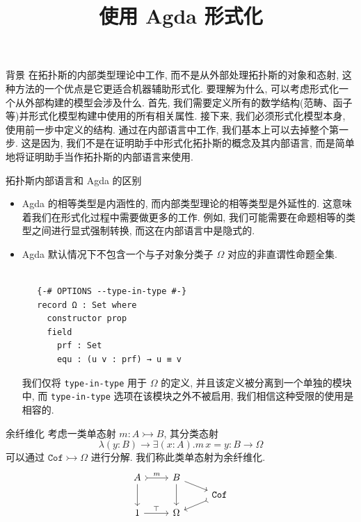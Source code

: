 \documentclass[aspectratio=169,xcolor=dvipsnames]{beamer}
\title{使用 Agda 形式化}
\date{}
\newcommand\Cof{\mathtt{Cof}}
\begin{document}
\begin{frame}
    \titlepage
\end{frame}

\begin{frame}{背景}
  在拓扑斯的内部类型理论中工作, 而不是从外部处理拓扑斯的对象和态射, 这种方法的一个优点是它更适合机器辅助形式化. 要理解为什么, 可以考虑形式化一个从外部构建的模型会涉及什么. 首先, 我们需要定义所有的数学结构(范畴、函子等)并形式化模型构建中使用的所有相关属性. 接下来, 我们必须形式化模型本身, 使用前一步中定义的结构. 通过在内部语言中工作, 我们基本上可以去掉整个第一步. 这是因为, 我们不是在证明助手中形式化拓扑斯的概念及其内部语言, 而是简单地将证明助手当作拓扑斯的内部语言来使用.
\end{frame}

\begin{frame}{拓扑斯内部语言和 Agda 的区别}
  \begin{itemize}
  \item Agda 的相等类型是内涵性的, 而内部类型理论的相等类型是外延性的. 这意味着我们在形式化过程中需要做更多的工作. 例如, 我们可能需要在命题相等的类型之间进行显式强制转换, 而这在内部语言中是隐式的.
  \item Agda 默认情况下不包含一个与子对象分类子 $Ω$ 对应的非直谓性命题全集.
  \begin{verbatim}

   {-# OPTIONS --type-in-type #-}
   record Ω : Set where
     constructor prop
     field
       prf : Set
       equ : (u v : prf) → u ≡ v
  \end{verbatim}
  我们仅将 \verb|type-in-type| 用于 $Ω$ 的定义, 并且该定义被分离到一个单独的模块中, 而 \verb|type-in-type| 选项在该模块之外不被启用, 我们相信这种受限的使用是相容的.
\end{itemize}
\end{frame}

\begin{frame}{余纤维化}
  考虑一类单态射 $m : A\rightarrowtail B$, 其分类态射
  \[
  \lambda(y:B)\to\exists(x:A). m\,x = y : B \to \Omega
  \]
  可以通过 $\Cof\rightarrowtail\Omega$ 进行分解. 我们称此类单态射为余纤维化.
  \[
  \begin{tikzcd}[row sep = tiny]
  A \arrow[r,tail, "m"] \arrow[dd] & B \arrow[dd] \arrow[dr] & \\
  & & \Cof \arrow[dl,tail] \\
  1 \arrow[r,"\top"] & \Omega &
  \end{tikzcd}
  \]
\end{frame}
\end{document}

